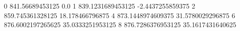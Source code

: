 0 841.56689453125 0.0
1 839.1231689453125 -2.4437255859375
2 859.745361328125 18.178466796875
4 873.1448974609375 31.5780029296875
6 876.6002197265625 35.0333251953125
8 876.7286376953125 35.1617431640625
